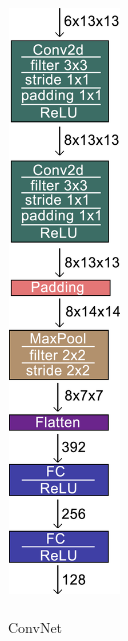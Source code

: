 \begin{figure}
	\centering
	\includegraphics[width=3.0cm, height=15.5cm]{Abbildungen/ConvNet.png}
	\caption[ConvNet]{\\ConvNet}
	\label{fig:ConvNet}
\end{figure}

